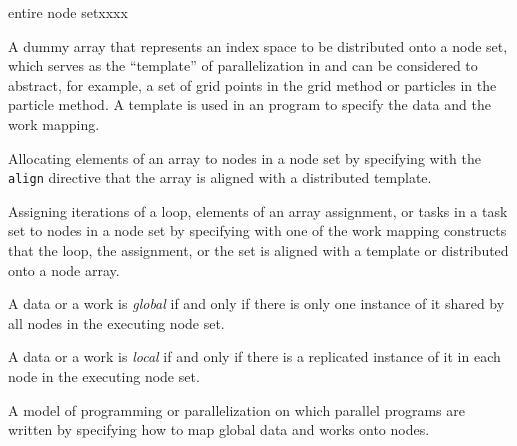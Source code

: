 \begin{namelist}{entire node setxxxx}

 A dummy array that represents an index space to be distributed onto a
 node set, which serves as the ``template'' of parallelization in
 {\XMP} and can be considered to abstract, for example, a set of grid
 points in the grid method or particles in the particle method.
%
 A template is used in an {\XMP} program to specify the data and the
 work mapping.



 Allocating elements of an array to nodes in a node set by specifying
 with the {\tt align} directive that the array is aligned with a
 distributed template.



 Assigning iterations of a loop, elements of an array assignment, or
 tasks in a task set to nodes in a node set by specifying with one of
 the work mapping constructs that the loop, the assignment, or the set
 is aligned with a template or distributed onto a node array.

%


 A data or a work is {\it global} if and only if there is only one
 instance of it shared by all nodes in the executing node set.


 A data or a work is {\it local} if and only if there is a replicated
 instance of it in each node in the executing node set.


 A model of programming or parallelization on which parallel programs
 are written by specifying how to map global data and works onto nodes.


\end{namelist}
